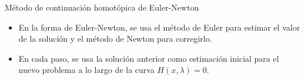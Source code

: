 \documentclass[a4paper,10pt]{beamer}
\begin{document}
\begin{frame}{Método de continuación homotópica de Euler-Newton}

	\begin{itemize}
		\item En la forma de Euler-Newton, se usa el método de Euler para estimar el valor de la solución y el método de Newton para corregirlo.
		\item En cada paso, se usa la solución anterior como estimación inicial para el nuevo problema a lo largo de la curva $H(x,\lambda)=0$.
		\begin{figure}[H]
			\centering
		
		
			\begin{tikzpicture}[x=0.75pt,y=0.75pt,yscale=-0.6,xscale=0.6]
			

\end{tikzpicture}
\end{figure}
\end{itemize}
\end{frame}
\end{document}
